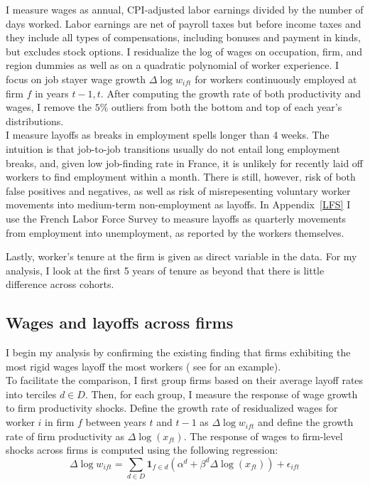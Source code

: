 I measure wages as annual, CPI-adjusted labor earnings divided by the number of days worked. Labor earnings are net of payroll taxes but before income
taxes and they include all types of compensations, including bonuses and payment in kinds, but excludes stock options. I residualize the log of wages on occupation, firm, and region dummies as well as on a quadratic polynomial of worker experience. I focus on job stayer wage growth $\Delta \log w_{ift}$ for workers continuously employed at firm $f$ in years $t-1,t$.
After computing the growth rate of both productivity and wages, I remove the $5\%$ outliers from both the bottom and top of each year's distributions. \\
I measure layoffs as breaks in employment spells longer than 4 weeks. The intuition is that job-to-job transitions usually do not entail long employment breaks, and, given low job-finding rate in France, it is unlikely for recently laid off workers to find employment within a month. There is still, however, risk of both false positives and negatives, as well as risk of misrepesenting voluntary worker movements into medium-term non-employment as layoffs. In Appendix~\ref{LFS} I use the French Labor Force Survey to measure layoffs as quarterly movements from employment into unemployment, as reported by the workers themselves. 

Lastly, worker's tenure at the firm is given as direct variable in the data. For my analysis, I look at the first 5 years of tenure as beyond that there is little difference across cohorts.
\subsection{Wages and layoffs across firms}
I begin my analysis by confirming the existing finding that firms exhibiting the most rigid wages layoff the most workers ( see \textcite{enrlich2024} for an example). \\
To facilitate the comparison, I first group firms based on their average layoff rates into terciles $d \in D$.
Then, for each group, I measure the response of wage growth to firm productivity shocks. Define the growth rate of residualized wages for worker $i$ in firm $f$ between years $t$ and $t-1$ as $\Delta \log w_{ift}$ and define the growth rate of firm productivity as $\Delta \log(x_{ft})$.
The response of wages to firm-level shocks across firms is computed using the following regression:
\[ \Delta \log w_{ift} = \sum_{d \in D} \mathbf{1}_{f \in d}(\alpha^d + \beta^{d}\Delta \log(x_{ft})) + \epsilon_{ift}\]

